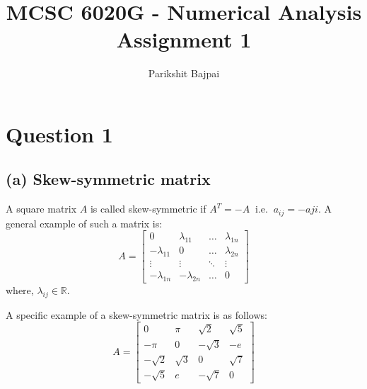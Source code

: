 \documentclass[11pt, oneside]{article}
\title{MCSC 6020G - Numerical Analysis \\
        \Large Assignment 1}
\author{Parikshit Bajpai}
\date{}
\begin{document}
\maketitle

\section*{Question 1}
\subsection*{(a) Skew-symmetric matrix}
  A square matrix $A$ is called skew-symmetric if $A^T = -A \;\; \text{i.e.} \;\; a_{ij}=-a{ji}$. A general example of such a matrix is:
  \begin{equation*}
      A=
      \begin{bmatrix}
        0              & \lambda_{11}  & \dots   & \lambda_{1n} \\
        -\lambda_{11}  & 0             & \dots   & \lambda_{2n} \\
        \vdots         & \vdots        & \ddots  & \vdots \\
        -\lambda_{1n}  & -\lambda_{2n} & \dots   & 0
      \end{bmatrix}
  \end{equation*}
  where, $\lambda_{ij} \in \mathbb{R}$.

  A specific example of a skew-symmetric matrix is as follows:
  \begin{equation*}
    A=
    \begin{bmatrix}
      0              & \pi        & \sqrt{2}     & \sqrt{5}\\
      -\pi           & 0          & -\sqrt{3}    & -e\\
      -\sqrt{2}      & \sqrt{3}   & 0            & \sqrt{7}\\
      -\sqrt{5}      & e          & -\sqrt{7}    & 0
    \end{bmatrix}
  \end{equation*}
\end{document}
